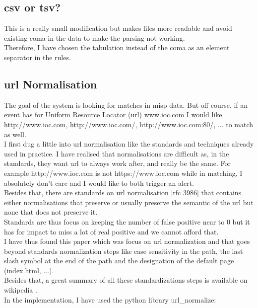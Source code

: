 \documentclass{eplmastersthesis}
\begin{document}
\subsection{\gls{csv} or \gls{tsv}?}
This is a really small modification but makes files more readable and avoid existing coma in the data to make the parsing not working.\\
Therefore, I have chosen the tabulation instead of the coma as an element separator in the rules.

\subsection{\gls{url} Normalisation}
The goal of the system is looking for matches in \gls{misp} data. But off course, if an event has for Uniform Resource Locator (\gls{url}) www.ioc.com I would like http://www.ioc.com, http://www.ioc.com/, http://www.ioc.com:80/, ... to match as well.\\
I first dug a little into \gls{url} normalisation like the standards and techniques already used in practice. I have realised that normalisations are difficult as, in the standards, they want \gls{url} to always work after, and really be the same. For example http://www.ioc.com is not https://www.ioc.com while in matching, I absolutely don't care and I would like to both trigger an alert.\\
Besides that, there are standards on \gls{url} normalisation [\gls{rfc} 3986] that contains either normalisations that preserve or usually preserve the semantic of the \gls{url} but none that does not preserve it.\\
Standards are thus focus on keeping the number of false positive near to 0 but it has for impact to miss a lot of real positive and we cannot afford that.\\
I have thus found this paper \cite{lee2005url} which was focus on \gls{url} normalization and that goes beyond standards normalization steps like case sensitivity in the path, the last slash symbol at the end of the path and the designation of the default page (index.html, ...).\\
Besides that, a great summary of all these standardizations steps is available on wikipedia \cite{wikiNormalizationURL}.\\
In the implementation, I have used the python library url\_normalize:
\end{document}

